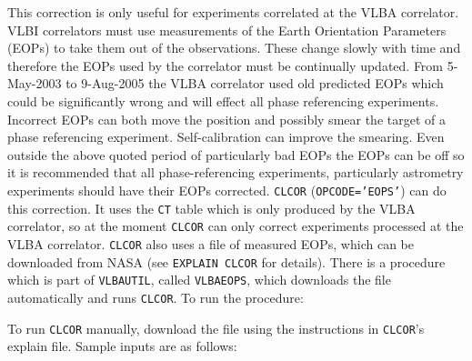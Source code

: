 This correction is only useful for experiments correlated at the VLBA
correlator.  VLBI correlators must use measurements of the Earth
Orientation Parameters (EOPs) to take them out of the observations.
These change slowly with time and therefore the EOPs used by the
correlator must be continually updated.  From 5-May-2003 to 9-Aug-2005
the VLBA correlator used old predicted EOPs which could be
significantly wrong and will effect all phase referencing experiments.
Incorrect EOPs can both move the position and possibly smear the
target of a phase referencing experiment.  Self-calibration can
improve the smearing.  Even outside the above quoted period of
particularly bad EOPs the EOPs can be off so it is recommended that
all phase-referencing experiments, particularly astrometry experiments
should have their EOPs corrected.  {\tt CLCOR} ({\tt OPCODE='EOPS'})
can do this correction.  It uses the {\tt CT} table which is only
produced by the VLBA correlator, so at the moment {\tt CLCOR} can only
correct experiments processed at the VLBA correlator.  {\tt CLCOR}
also uses a file of measured EOPs, which can be downloaded from NASA
(see {\tt EXPLAIN CLCOR} for details).  There is a procedure
which is part of {\tt VLBAUTIL}, called {\tt VLBAEOPS}, which
downloads the file automatically and runs {\tt CLCOR}\@.  To run the
procedure:

To run {\tt CLCOR} manually, download the file using the instructions
in {\tt CLCOR}'s explain file.  Sample inputs are as follows:

